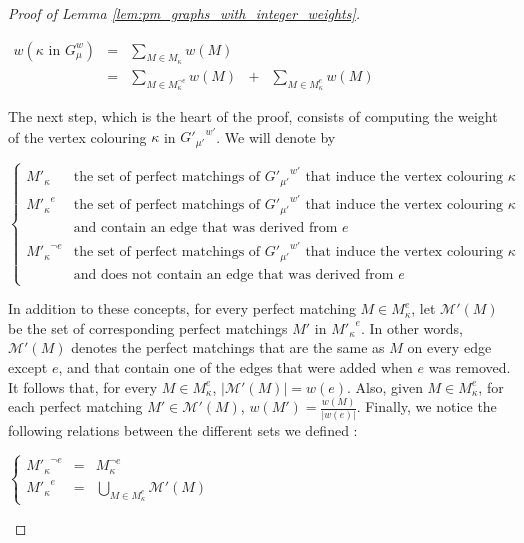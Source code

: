 \begin{proof}[Proof of Lemma \ref{lem:pm_graphs_with_integer_weights}]
    \begin{center}
        $\begin{array}{lclcl}
            w(\kappa \mbox{ in } G_\mu^w)
                & = & \sum\limits_{M \in M_{\kappa}} w(M) \\
                & = & \sum\limits_{M \in M_{\kappa}^{\neg e}} w(M) & + & \sum\limits_{M \in M_{\kappa}^{e}} w(M)
        \end{array}$
    \end{center}

    The next step, which is the heart of the proof, consists of computing the weight of the vertex colouring $\kappa$ in ${G'_{\mu'}}^{w'}$.
    We will denote by

    \begin{center}
        $\left\{
            \begin{array}{ll}
                M'_{\kappa}            & \mbox{the set of perfect matchings of } {G'_{\mu'}}^{w'} \mbox{ that induce the vertex colouring } \kappa \\
                {M'_{\kappa}}^e        & \mbox{the set of perfect matchings of } {G'_{\mu'}}^{w'} \mbox{ that induce the vertex colouring } \kappa \\
                                   & \mbox{and contain an edge that was derived from } e \\
                {M'_{\kappa}}^{\neg e} & \mbox{the set of perfect matchings of } {G'_{\mu'}}^{w'} \mbox{ that induce the vertex colouring } \kappa \\
                                   & \mbox{and does not contain an edge that was derived from } e
            \end{array}
        \right.$
    \end{center}

    In addition to these concepts, for every perfect matching $M \in M_{\kappa}^e$, let $\mathcal{M}'(M)$ be the set of corresponding perfect matchings $M'$ in ${M'_{\kappa}}^e$.
    In other words, $\mathcal{M}'(M)$ denotes the perfect matchings that are the same as $M$ on every edge except $e$, and that contain one of the edges that were added when $e$ was removed.
    It follows that, for every $M \in M_{\kappa}^e$, $|\mathcal{M}'(M)| = w(e)$.
    Also, given $M \in M_{\kappa}^e$, for each perfect matching $M' \in \mathcal{M}'(M)$, $w(M') = \frac{w(M)}{|w(e)|}$.
    Finally, we notice the following relations between the different sets we defined :

    \begin{center}
        $\left\{
            \begin{array}{lcl}
                {M'_{\kappa}}^{\neg e} & = & M_{\kappa}^{\neg e} \\
                {M'_{\kappa}}^e        & = & \bigcup\limits_{M \in M_{\kappa}^e} \mathcal{M}'(M)
            \end{array}
        \right.$
    \end{center}


\end{proof}
